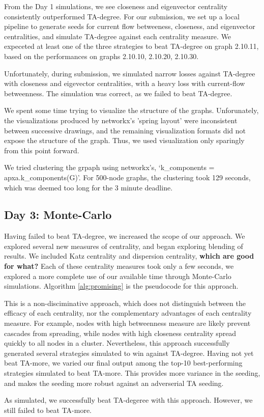 \documentclass[letterpaper, 11pt]{article}
\begin{document}
From the Day 1 simulations, we see closeness and eigenvector centrality consistently outperformed TA-degree. For our submission, we set up a local pipeline to generate seeds for current flow betweeness, closeness, and eigenvector centralities, and simulate TA-degree against each centrality measure. We expeceted at least one of the three strategies to beat TA-degree on graph 2.10.11, based on the performances on graphs 2.10.10, 2.10.20, 2.10.30.
\par
Unfortunately, during submission, we simulated narrow losses against TA-degree with closeness and eigevector centralities, with a heavy loss with current-flow betweenness. The simulation was correct, as we failed to beat TA-degree.
\par
We spent some time trying to visualize the structure of the graphs. Unforunately, the visualizations produced by networkx's 'spring layout' were inconsistent between successive drawings, and the remaining visualization formats did not expose the structure of the graph. Thus, we used visualization only sparingly from this point forward.
\par
We tried clustering the grpaph using networkx's, ‘k\_components = apxa.k\_components(G)’. For 500-node graphs, the clustering took 129 seconds, which was deemed too long for the 3 minute deadline.

\subsection{Day 3: Monte-Carlo}
Having failed to beat TA-degree, we increased the scope of our approach. We explored several new measures of centrality, and began exploring blending of results. We included Katz centrality and dispersion centrality, \textbf{which are good for what?}
Each of these centrality measures took only a few seconds, we explored a more complete use of our available time through Monte-Carlo simulations. Algorithm \ref{alg:promising} is the pseudocode for this approach.
\par
This is a non-disciminative approach, which does not distinguish between the efficacy of each centrality, nor the complementary advantages of each centrality measure. For example, nodes with high betweenness measure are likely prevent cascades from spreading, while nodes with high closeness centrality spread quickly to all nodes in a cluster. Nevertheless, this approach successfully generated several strategies simulated to win against TA-degree. Having not yet beat TA-more, we varied our final output among the top-10 best-performing strategies simulated to beat TA-more. This provides more variance in the seeding, and makes the seeding more robust against an adverserial TA seeding.
\par
As simulated, we successfully beat TA-degeree with this approach. However, we still failed to beat TA-more.
\end{document}
